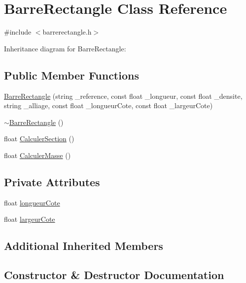 \hypertarget{class_barre_rectangle}{}\section{Barre\+Rectangle Class Reference}
\label{class_barre_rectangle}


{\ttfamily \#include $<$barrerectangle.\+h$>$}



Inheritance diagram for Barre\+Rectangle\+:
\subsection*{Public Member Functions}
\begin{DoxyCompactItemize}
\item 
\hyperlink{class_barre_rectangle_a4c41f88c7b44753a11e74d0c28e2130f}{Barre\+Rectangle} (string \+\_\+reference, const float \+\_\+longueur, const float \+\_\+densite, string \+\_\+alliage, const float \+\_\+longueur\+Cote, const float \+\_\+largeur\+Cote)
\item 
\hyperlink{class_barre_rectangle_aaf9fee36e7a6b914af9fc0bff25674e4}{$\sim$\+Barre\+Rectangle} ()
\item 
float \hyperlink{class_barre_rectangle_aca359a79b9e74a94867ccaa4341f51ae}{Calculer\+Section} ()
\item 
float \hyperlink{class_barre_rectangle_a9edb62e31a33790146eb0fd2b3fd7e4e}{Calculer\+Masse} ()
\end{DoxyCompactItemize}
\subsection*{Private Attributes}
\begin{DoxyCompactItemize}
\item 
float \hyperlink{class_barre_rectangle_a8b499c3a9e28d479072f39232cfceef6}{longueur\+Cote}
\item 
float \hyperlink{class_barre_rectangle_acbf8366a8851f9534f998324365874c1}{largeur\+Cote}
\end{DoxyCompactItemize}
\subsection*{Additional Inherited Members}


\subsection{Constructor \& Destructor Documentation}
\mbox{\label{class_barre_rectangle_a4c41f88c7b44753a11e74d0c28e2130f}} 
